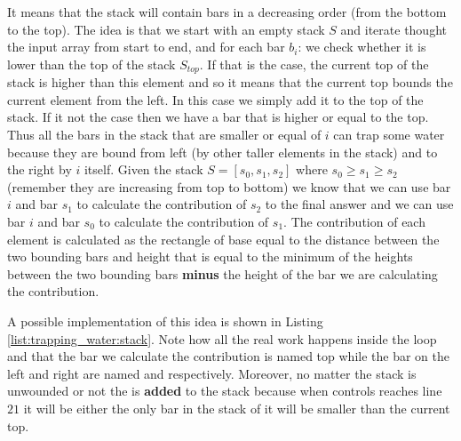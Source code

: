 It means that the stack will contain bars in a decreasing order (from the bottom to the top). The idea is that we start with an empty stack $S$ and iterate thought the input array from start to end, and for each bar $b_i$:
we check whether it is lower than the top of the stack $S_{top}$. If that is the case, the current top of the stack is higher than this element and so it means that the current top bounds the current element from the left. In this case we simply add it to the  top of the stack. If it not the case then we have a bar that is higher or equal to the top. Thus  all the bars in the stack that are smaller or equal of $i$ can trap some water because they are bound from left (by other taller elements in the stack) and to the right by $i$ itself.
Given the stack $S=[s_0, s_1,s_2]$ where $s_0 \geq s_1 \geq s_2$ (remember they are increasing from top to bottom) we know that we can use bar $i$ and bar $s_1$ to calculate the contribution of $s_2$ to the final answer and we can use bar $i$ and bar $s_0$ to calculate the contribution of $s_1$. The contribution of each element is calculated as the rectangle of base equal to the distance between the two bounding bars and height that is equal to the minimum of the heights between the two bounding bars \textbf{minus} the height of the bar we are calculating the contribution. 

A possible implementation of this idea is shown in Listing \ref{list:trapping_water:stack}. Note how all the real work happens inside the  loop and that the bar we calculate the contribution is named top while the bar on the left and right are named  and  respectively. Moreover, no matter the stack is unwounded or not the  is \textbf{added} to the stack because when controls reaches line $21$ it will be either the only bar in the stack of it will be smaller than the current top.


